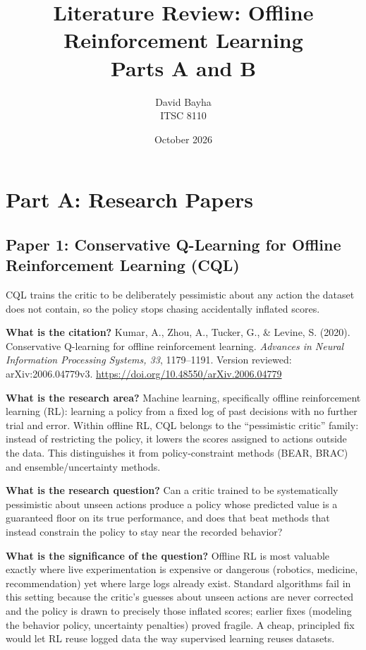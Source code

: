 \documentclass[11pt]{article}
\title{Literature Review: Offline Reinforcement Learning\\Parts A and B}
\author{David Bayha\\ITSC 8110}
\date{October 2026}
\newcommand{\paper}[1]{\subsection*{#1}}
\newcommand{\q}[2]{\item \textbf{#1} #2}
\begin{document}
\maketitle



\section*{Part A: Research Papers}



\paper{Paper 1: Conservative Q-Learning for Offline Reinforcement Learning (CQL)}
CQL trains the critic to be deliberately pessimistic about any action the dataset does not contain, so the policy stops chasing accidentally inflated scores.
\begin{qna}

\q{What is the citation?}
Kumar, A., Zhou, A., Tucker, G., \& Levine, S. (2020). Conservative Q-learning for offline reinforcement learning. \emph{Advances in Neural Information Processing Systems, 33}, 1179--1191. Version reviewed: arXiv:2006.04779v3. \url{https://doi.org/10.48550/arXiv.2006.04779}

\q{What is the research area?}
Machine learning, specifically offline reinforcement learning (RL): learning a policy from a fixed log of past decisions with no further trial and error. Within offline RL, CQL belongs to the ``pessimistic critic'' family: instead of restricting the policy, it lowers the scores assigned to actions outside the data. This distinguishes it from policy-constraint methods (BEAR, BRAC) and ensemble/uncertainty methods.

\q{What is the research question?}
Can a critic trained to be systematically pessimistic about unseen actions produce a policy whose predicted value is a guaranteed floor on its true performance, and does that beat methods that instead constrain the policy to stay near the recorded behavior?

\q{What is the significance of the question?}
Offline RL is most valuable exactly where live experimentation is expensive or dangerous (robotics, medicine, recommendation) yet where large logs already exist. Standard algorithms fail in this setting because the critic's guesses about unseen actions are never corrected and the policy is drawn to precisely those inflated scores; earlier fixes (modeling the behavior policy, uncertainty penalties) proved fragile. A cheap, principled fix would let RL reuse logged data the way supervised learning reuses datasets.


\end{qna}
\end{document}
